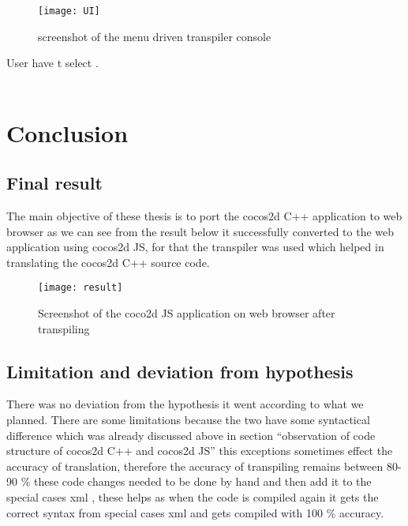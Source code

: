 \documentclass[23pt]{article}
\begin{document}
\begin{figure}[h]
\caption{screenshot of the menu driven transpiler console}
\centering
\texttt{[image: UI]}
\end{figure}

{\Large User have t select . \\ \\ \par}

\newpage

\section{Conclusion}

\subsection{Final result}

{\Large The main objective of these thesis is to port the cocos2d C++ application to web browser as we can see from the result below it successfully converted to the web application using cocos2d JS, for that the transpiler was used which helped in translating the cocos2d C++ source code. \\  \par}


\begin{figure}[h]
\caption{Screenshot of the coco2d JS application on web browser after transpiling}
\centering
\texttt{[image: result]}
\end{figure}

\newpage

\subsection{Limitation and deviation from hypothesis}
{\Large There was no deviation from the hypothesis it went according to what we planned.
             There are some limitations because the two have some syntactical difference which was already discussed above in section “observation of code structure of cocos2d C++  and cocos2d JS” this exceptions sometimes effect the accuracy of translation, therefore  the accuracy of transpiling remains between 80-90 \% these code changes needed to be done by hand and then add it to the special cases xml , these  helps as when the code is compiled  again it gets the correct syntax from special cases xml and  gets compiled with 100 \% accuracy.
\\  \par}
\end{document}

